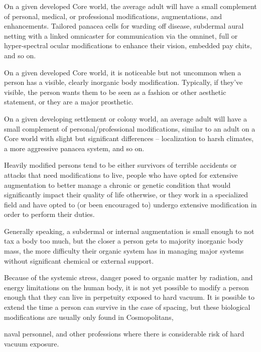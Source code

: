 On a given developed Core world, the average adult will have a small complement of personal,  
medical, or professional modifications, augmentations, and enhancements. Tailored panacea  
cells for warding off disease, subdermal aural netting with a linked omnicaster for communication  
via the omninet, full or hyper-spectral ocular modifications to enhance their vision, embedded  
pay chits, and so on.
 

On a given developed Core world, it is noticeable but not uncommon when a person has a  
visible, clearly inorganic body modification. Typically, if they’ve visible, the person wants them to  
be seen as a fashion or other aesthetic statement, or they are a major prosthetic. 
 
 
 
On a given developing settlement or colony world, an average adult will have a small  
complement of personal/professional modifications, similar to an adult on a Core world with  
slight but significant differences -- localization to harsh climates, a more aggressive panacea  
system, and so on. 
 

Heavily modified persons tend to be either survivors of terrible accidents or attacks that need  
modifications to live, people who have opted for extensive augmentation to better manage a  
chronic or genetic condition that would significantly impact their quality of life otherwise, or they  
work in a specialized field and have opted to (or been encouraged to) undergo extensive  
modification in order to perform their duties. 
 

Generally speaking, a subdermal or internal augmentation is small enough to not tax a body too  
much, but the closer a person gets to majority inorganic body mass, the more difficulty their  
organic system has in managing major systems without significant chemical or external support. 
 

Because of the systemic stress, danger posed to organic matter by radiation, and energy  
limitations on the human body, it is not yet possible to modify a person enough that they can live  
in perpetuity exposed to hard vacuum. It is possible to extend the time a person can survive in  
the case of spacing, but these biological modifications are usually only found in Cosmopolitans,  

                                                                                                                  


naval personnel, and other professions where there is considerable risk of hard vacuum  
exposure.  
 

